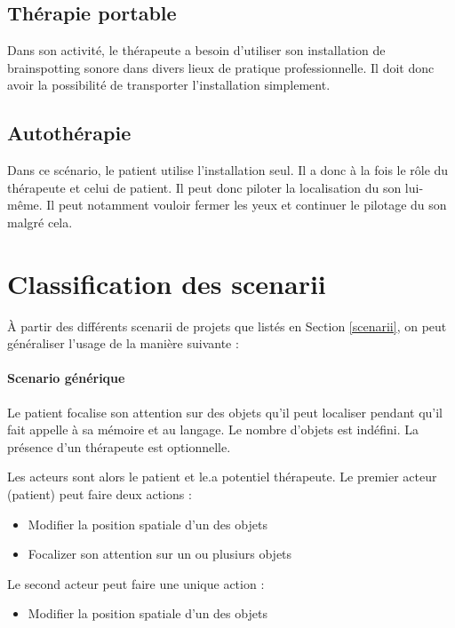 \documentclass[french]{article}
\begin{document}
\subsection{Thérapie portable}
Dans son activité, le thérapeute a besoin d'utiliser son installation de brainspotting sonore dans divers lieux de pratique professionnelle. Il doit donc avoir la possibilité de transporter l'installation simplement.

\subsection{Autothérapie}
Dans ce scénario, le patient utilise l'installation seul. Il a donc à la fois le rôle du thérapeute et celui de patient. Il peut donc piloter  la localisation du son lui-même. Il peut notamment vouloir fermer les yeux et continuer le pilotage du son malgré cela.


\section{Classification des scenarii}
À partir des différents scenarii de projets que listés en Section \ref{scenarii}, on peut généraliser l'usage de la manière suivante : 

\paragraph{Scenario générique} 
Le patient focalise son attention sur des objets qu'il peut localiser pendant qu'il fait appelle à sa mémoire et au langage. Le nombre d'objets est indéfini. La présence d'un thérapeute est optionnelle. 

Les acteurs sont alors le patient et le.a potentiel thérapeute. Le premier acteur (patient) peut faire deux actions : 
\begin{itemize}[label={\textbullet}]
	\item Modifier la position spatiale d'un des objets
	\item Focalizer son attention sur un ou plusiurs objets
\end{itemize}
Le second acteur peut faire une unique action : 
\begin{itemize}[label={\textbullet}]
	\item  Modifier la position spatiale d'un des objets
\end{itemize}
\end{document}
